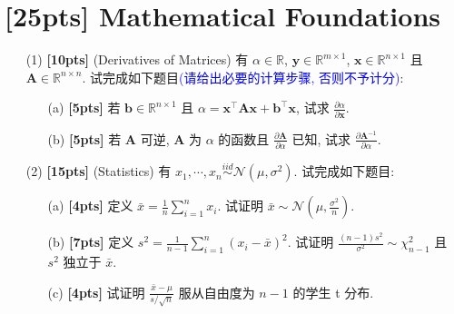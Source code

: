 \documentclass[a4paper,UTF8]{article}
\numberwithin{equation}{section}
\theoremstyle{definition}
\def \A {\mathbf{A}}
\def \y {\boldsymbol{y}}
\def \x {\boldsymbol{x}}
\def \b {\mathbf{b}}
\begin{document}
\section{[25pts] Mathematical Foundations}
\begin{enumerate}
    \item[(1)] \textbf{[10pts]} (Derivatives of Matrices) 
    有 $\alpha \in \mathbb{R}$, $\y\in \mathbb{R}^{m\times 1}$, $\x\in \mathbb{R}^{n\times 1}$ 且 $\A\in \mathbb{R}^{n\times n}$. 试完成如下题目\textcolor{blue}{(请给出必要的计算步骤, 否则不予计分)}:  
    \begin{enumerate}
        \item[(a)] \textbf{[5pts]} 若 $\b\in\mathbb{R}^{n\times 1}$ 且 $\alpha=\x^\top\A\x + \b^\top \x$, 试求 $\frac{\partial \alpha}{\partial \x}$.
        \item[(b)] \textbf{[5pts]} 若 $\A$ 可逆, $\A$ 为 $\alpha$ 的函数且 $\frac{\partial \A}{\partial \alpha}$ 已知, 试求 $\frac{\partial \A^{-1}}{\partial \alpha}$.
    \end{enumerate}
    \item[(2)] \textbf{[15pts]} (Statistics) 
    有 $x_1,\cdots,x_n \mathop{\sim}\limits^{iid} \mathcal{N}(\mu, \sigma^2)$. 试完成如下题目: 
    \begin{enumerate}
        \item[(a)] \textbf{[4pts]} 定义 $\bar{x} = \frac{1}{n}\sum\limits_{i=1}^n x_i$. 试证明 $\bar{x}\sim \mathcal{N}(\mu, \frac{\sigma^2}{n})$. 
        \item[(b)] \textbf{[7pts]} 定义 $s^2 = \frac{1}{n-1}\sum\limits_{i=1}^n (x_i - \bar{x})^2$. 试证明 $\frac{(n-1)s^2}{\sigma^2}\sim \chi^2_{n-1}$ 且 $s^2$ 独立于 $\bar{x}$. 
        \item[(c)] \textbf{[4pts]} 试证明 $\frac{\bar{x}-\mu}{s/\sqrt{n}}$ 服从自由度为 $n-1$ 的学生 t 分布. 
    \end{enumerate}
\end{enumerate}
\end{document}
